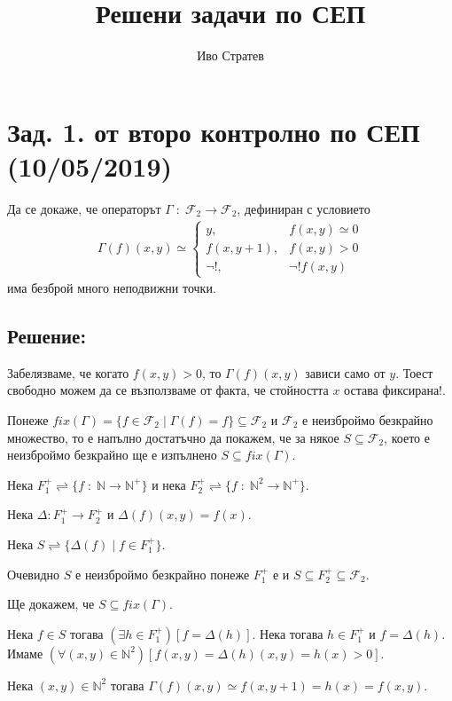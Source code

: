 \documentclass{article}
\title{Решени задачи по СЕП}
\author{Иво Стратев}
\begin{document}
\maketitle
\section*{Зад. 1. от второ контролно по СЕП (10/05/2019)}
Да се докаже, че операторът \(\Gamma \; : \; \mathcal{F}_2 \to \mathcal{F}_2\),
дефиниран с условието
\begin{align*}
\Gamma(f)(x, y) \simeq \begin{cases}
    y, & f(x, y) \simeq 0 \\
    f(x, y + 1), & f(x, y) > 0 \\
    \lnot !, & \lnot !f(x, y)
\end{cases}
\end{align*}
има безброй много неподвижни точки.
\subsection*{Решение:}
Забелязваме, че когато \(f(x, y) > 0\), то \(\Gamma(f)(x, y)\) зависи само от \(y\).
Тоест свободно можем да се възползваме от факта, че стойността \(x\) остава фиксирана!.

Понеже \(fix(\Gamma) = \{f \in \mathcal{F}_2 \; | \; \Gamma(f) = f\} \subseteq \mathcal{F}_2\) и 
\(\mathcal{F}_2\) е неизброймо безкрайно множество, то е напълно достатъчно да покажем,
че за някое \(S \subseteq \mathcal{F}_2\), което е неизброймо безкрайно ще е изпълнено \(S \subseteq fix(\Gamma)\).

Нека \(F_1^+ \rightleftharpoons \{f \; : \; \mathbb{N} \to \mathbb{N}^+\}\) и нека \(F_2^+ \rightleftharpoons \{f \; : \; \mathbb{N}^2 \to \mathbb{N}^+\}\).

Нека \(\Delta : F_1^+ \to F_2^+\) и \(\Delta(f)(x, y) = f(x)\).

Нека \(S \rightleftharpoons \{\Delta(f) \; | \; f \in F_1^+\}\).

Очевидно \(S\) е неизброймо безкрайно понеже \(F_1^+\) е и \(S \subseteq F_2^+ \subseteq \mathcal{F}_2\).

Ще докажем, че \(S \subseteq fix(\Gamma)\).

Нека \(f \in S\) тогава \((\exists h \in F_1^+)[f = \Delta(h)]\).
Нека тогава \(h \in F_1^+\) и \(f = \Delta(h)\).
Имаме \((\forall (x, y) \in \mathbb{N}^2)[f(x, y) = \Delta(h)(x, y) = h(x) > 0]\).

Нека \((x, y) \in \mathbb{N}^2\) тогава \(\Gamma(f)(x, y) \simeq f(x, y + 1) = h(x) = f(x, y)\).
\end{document}
